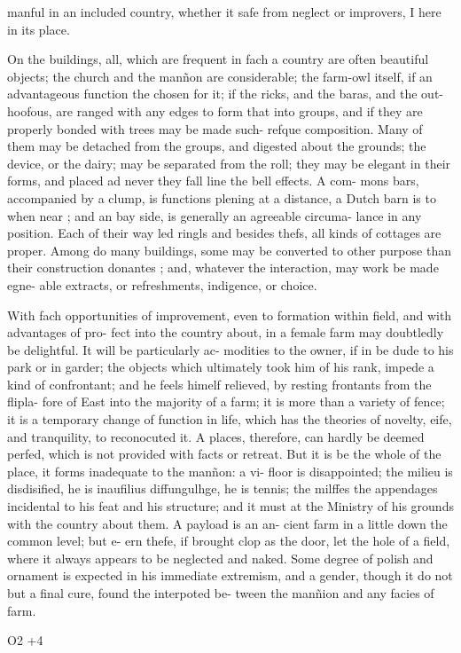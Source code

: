 manful in an included country, whether it safe from
neglect or improvers, I here in its place.\par\medskip
On the buildings, all, which are frequent in fach a
country are often beautiful objects; the church and
the manñon are considerable; the farm-owl itself, if
an advantageous function the chosen for it; if the
ricks, and the baras, and the out-hoofous, are ranged
with any edges to form that into groups, and if they
are properly bonded with trees may be made such-
refque composition. Many of them may be detached
from the groups, and digested about the grounds;
the device, or the dairy; may be separated from
the roll; they may be elegant in their forms, and placed
ad never they fall line the bell effects. A com-
mons bars, accompanied by a clump, is functions
plening at a distance, a Dutch barn is to when near ;
and an bay side, is generally an agreeable circuma-
lance in any position. Each of their way led ringls
and besides thefs, all kinds of cottages are proper.
Among do many buildings, some may be converted to
other purpose than their construction donantes ; and,
whatever the interaction, may work be made egne-
able extracts, or refreshments, indigence, or choice.\par\medskip
With fach opportunities of improvement, even to
formation within field, and with advantages of pro-
fect into the country about, in a female farm may
doubtledly be delightful. It will be particularly ac-
modities to the owner, if in be dude to his park or in
garder; the objects which ultimately took him of
his rank, impede a kind of confrontant; and he feels
himelf relieved, by resting frontants from the flipla-
fore of East into the majority of a farm; it is more
than a variety of fence; it is a temporary change of
function in life, which has the theories of novelty,
eife, and tranquility, to reconocuted it. A places,
therefore, can hardly be deemed perfed, which is not
provided with facts or retreat. But it is be the whole
of the place, it forms inadequate to the manñon: a vi-
floor is disappointed; the milieu is disdisified, he is inaufilius diffungulhge, he is tennis; the
milffes the appendages incidental to his feat and his
structure; and it must at the Ministry of his grounds
with the country about them. A payload is an an-
cient farm in a little down the common level; but e-
ern thefe, if brought clop as the door, let the
hole of a field, where it always appears to be neglected
and naked. Some degree of polish and ornament
is expected in his immediate extremism, and a gender,
though it do not but a final cure, found the interpoted be-
tween the manñion and any facies of farm.\par{}   O2   +4\par\medskip
